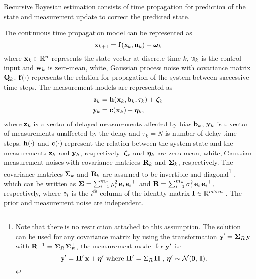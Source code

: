Recursive Bayesian estimation consists of time propagation for prediction of the state and measurement update to correct the predicted state.

The continuous time propagation model can be represented as
\begin{equation}
	\label{eqn:StatePropModel}
	\mathbf{x}_{k+1} = \mathbf{f} (\mathbf{x}_k, \mathbf{u}_k ) + \boldsymbol{\omega}_k
\end{equation}
where $\mathbf{x}_k \in\mathbb{R}^n$ represents the state vector at discrete-time $k$, $\mathbf{u}_k$ is the control input and $\mathbf{w}_k$ is zero-mean, white, Gaussian process noise with covariance matrix $\mathbf{Q}_k$. $\mathbf{f} (\cdot)$ represents the relation for propagation of the system between successive time steps.
The measurement models are represented as
\begin{align} 
	\label{eqn:DelayedMeasurementModel}
	\mathbf{z}_k &= \mathbf{h} ( \mathbf{x}_{k}, \mathbf{b}_{k}, \tau_k ) + \boldsymbol{\zeta}_k \\
	\label{eqn:UndelayedMeasurementModel}
	\mathbf{y}_k &= \mathbf{c} ( \mathbf{x}_k ) + \boldsymbol{\eta}_k,
\end{align}
where $\mathbf{z}_k$ is a vector of delayed measurements affected by bias $\mathbf{b}_k$, $\mathbf{y}_k$ is a vector of measurements unaffected by the delay and $\tau_k = N$ is number of delay time steps.
$\mathbf{h}(\cdot)$ and $\mathbf{c}(\cdot)$ represent the relation between the system state and the measurements $\mathbf{z}_k$ and $\mathbf{y}_k$, respectively.
$\boldsymbol{\zeta}_k$ and $\boldsymbol{\eta}_k$ are zero-mean, white, Gaussian measurement noises with covariance matrices $\mathbf{R}_k$ and $\boldsymbol{\Sigma}_k$, respectively.
The covariance matrices $\boldsymbol{\Sigma}_k$ and $\mathbf{R}_k$ are assumed to be invertible and diagonal\footnote
{\label{ftnt:R_assumption}
	Note that there is no restriction attached to this assumption. The solution can be used for any  covariance matrix by using the transformation $\mathbf{y}' =\boldsymbol{\Sigma}_R  \, \mathbf{y}$ with $\mathbf{R}^{-1} = \boldsymbol{\Sigma}_R \, \boldsymbol{\Sigma}_R^\top$, the measurement model for $\mathbf{y}'$ is:
	$$\mathbf{y}'=\mathbf{H}' \,\mathbf{x}+\boldsymbol{\eta}' \mbox{ where } \mathbf{H}' = \Sigma_R  \, \mathbf{H} \mbox{ , } \boldsymbol{\eta}' \sim \mathcal{N}(\boldsymbol{0},\,\mathbf{I}).$$
}
, which can be written as $\boldsymbol{\Sigma} = \sum_{i=1}^{m_d} \rho_{i}^2 \, \mathbf{e}_i  \,{\mathbf{e}_i}^\top$ and $\mathbf{R} = \sum_{i=1}^{m_u} \sigma_{i}^2 \, \mathbf{e}_i  \,{\mathbf{e}_i}^\top$, respectively, where $\mathbf{e}_i$ is the $i^{th}$ column of the identity matrix $\mathbf{I} \in \mathbb{R}^{m \times m}$ .
The prior and measurement noise are independent.

